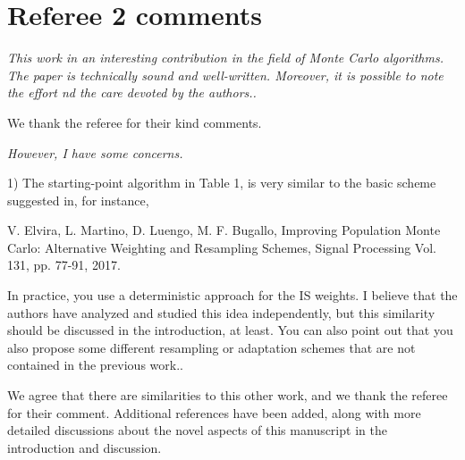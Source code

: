 \documentclass{article}
\newcommand{\comment}[2]{\vspace{0.6cm}{\bf Comment:} {\it #1.}

\vspace{0.3cm}{\bf Answer:} #2}
\begin{document}
\section*{Referee 2 comments}

\comment{This work in an interesting contribution in the field of Monte Carlo algorithms. The paper is technically sound and well-written. 
Moreover, it is possible to note the effort nd the care devoted by the authors.}{We thank the referee for their kind comments.}

\comment{However, I have some concerns. 

1) The starting-point algorithm in Table 1, is very similar to the basic scheme suggested in, for instance, 

V. Elvira, L. Martino, D. Luengo, M. F. Bugallo, Improving Population Monte Carlo: Alternative Weighting and Resampling Schemes, Signal Processing Vol. 131, pp. 77-91, 2017. 

In practice, you use a deterministic approach for the IS weights. 
I believe that the authors have analyzed and studied this idea independently, but this similarity should be discussed in the introduction, at least. 
You can also point out that you also propose some different resampling or adaptation schemes that are not contained in the previous work.}{We agree that there are similarities to this other work, and we thank the referee for their comment. Additional references have been added, along with more detailed discussions about the novel aspects of this manuscript in the introduction and discussion.}
\end{document}

